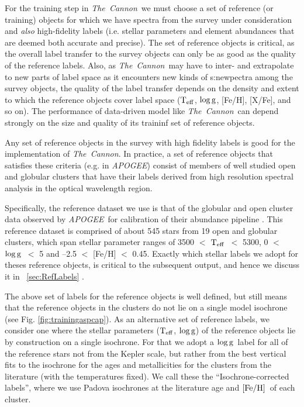 \documentclass[12pt, preprint]{aastex}
\newcommand{\teff}{\mbox{$\rm T_{eff}$}}
\newcommand{\feh}{\mbox{$\rm [Fe/H]$}}
\newcommand{\logg}{\mbox{$\rm \log g$}}
\newcommand{\tc}{\textsl{The~Cannon}}
\newcommand{\apogee}{\textsl{APOGEE}}
\begin{document}
For the training step in \tc\ we must choose a set of reference (or training) objects for which we have spectra from the survey under consideration and \emph{also} high-fidelity labels (i.e. stellar parameters and element abundances that are deemed both accurate and precise).
The set of reference objects is critical, as the overall label transfer to the survey objects can only be as good as the quality of the reference labels. 
Also, as \tc\ may have to inter- and extrapolate to new parts of label space as
it encounters new kinds of s:newpectra among the survey objects, the quality
of the label transfer depends on the density and extent to which the reference objects
cover label space (\teff, \logg, [Fe/H], [X/Fe], and so on). 
The performance of data-driven model like \tc\ can depend strongly on the size and quality of its traininf set of reference objects.

Any set of reference objects in the survey with high fidelity labels is good for the implementation of \tc.
In practice, a set of reference objects that satisfies these criteria (e.g. in \apogee )
consist of members of well studied open and globular clusters that have their labels derived from high resolution spectral analysis in the
optical wavelength region.

Specifically, the reference dataset we use is that of the globular and open cluster data observed by \apogee\ for calibration of their abundance pipeline \citep{Meszaros2013}. 
This reference dataset is comprised of about 545 stars from 19 open and globular clusters, which span stellar parameter ranges 
of 3500 $<$ \teff\ $<$ 5300, 0 $<$ \logg\ $<$ 5 and --2.5 $<$ [Fe/H] $<$ 0.45. 
Exactly which stellar labels we adopt for theses reference objects, is critical to the subsequent output, and hence we discuss it in ~\ref{sec:RefLabels} .



The above set of labels for the reference objects is well defined, but still means that the reference objects in the clusters do not lie on a single model isochrone 
(see Fig. \ref{fig:trainingaspcap}). 
As an alternative set of reference labels, we consider one where the stellar parameters (\teff , \logg ) of the reference objects lie by construction on a single isochrone. 
For that we adopt a \logg\ label for all of the reference stars not from the Kepler scale, but rather from the best vertical fits to the isochrone for the ages and metallicities for the clusters from the literature (with the temperatures fixed). We call these the ``Isochrone-corrected labels'', where we use Padova isochrones at the literature age and \feh\ of each cluster. 
\end{document}

